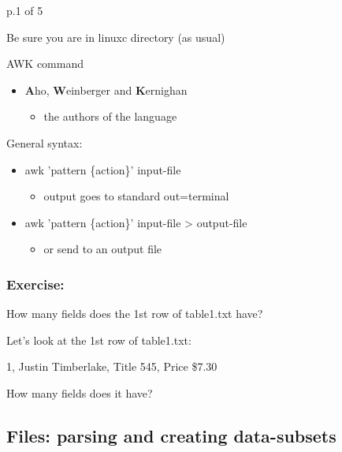 \documentclass[
]{book}
\providecommand{\tightlist}{%
  \setlength{\itemsep}{0pt}\setlength{\parskip}{0pt}}
\begin{document}
p.1 of 5

Be sure you are in linuxc directory (as usual)

AWK command

\begin{itemize}
\tightlist
\item
  \textbf{A}ho, \textbf{W}einberger and \textbf{K}ernighan

  \begin{itemize}
  \tightlist
  \item
    the authors of the language
  \end{itemize}
\end{itemize}

General syntax:

\begin{itemize}
\tightlist
\item
  awk 'pattern \{action\}' input-file

  \begin{itemize}
  \tightlist
  \item
    output goes to standard out=terminal
  \end{itemize}
\item
  awk 'pattern \{action\}' input-file \textgreater{} output-file

  \begin{itemize}
  \tightlist
  \item
    or send to an output file
  \end{itemize}
\end{itemize}

\hypertarget{exercise}{%
\subsubsection*{Exercise:}\label{exercise}}

How many fields does the 1st row of table1.txt have?

Let's look at the 1st row of table1.txt:

1, Justin Timberlake, Title 545, Price \$7.30

How many fields does it have?

\hypertarget{files-parsing-and-creating-data-subsets-1}{%
\subsection{Files: parsing and creating data-subsets}\label{files-parsing-and-creating-data-subsets-1}}
\end{document}
